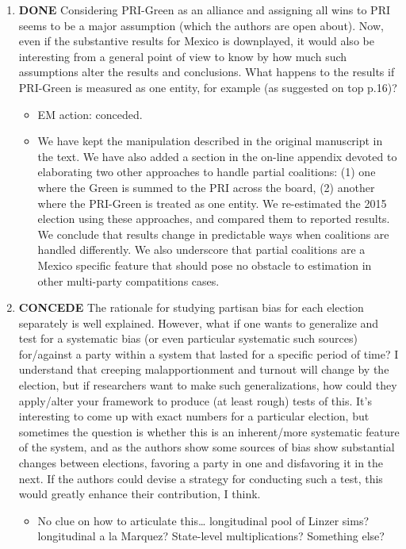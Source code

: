 \documentclass{article}
\begin{document}
\begin{enumerate}
\item {\bfseries\sffamily DONE} Considering PRI-Green as an alliance and assigning all wins to PRI seems to be a major assumption (which the authors are open about). Now, even if the substantive results for Mexico is downplayed, it would also be interesting from a general point of view to know by how much such assumptions alter the results and conclusions. What happens to the results if PRI-Green is measured as one entity, for example (as suggested on top p.16)?
\label{sec:orgheadline12}
\begin{itemize}
\item EM action: conceded.
\item We have kept the manipulation described in the original manuscript in the text. We have also added a section in the on-line appendix devoted to elaborating two other approaches to handle partial coalitions: (1) one where the Green is summed to the PRI across the board, (2) another where the PRI-Green is treated as one entity. We re-estimated the 2015 election using these approaches, and compared them to reported results. We conclude that results change in predictable ways when coalitions are handled differently. We also underscore that partial coalitions are a Mexico specific feature that should pose no obstacle to estimation in other multi-party compatitions cases.
\end{itemize}

\item {\bfseries\sffamily CONCEDE} The rationale for studying partisan bias for each election separately is well explained. However, what if one wants to generalize and test for a systematic bias (or even particular systematic such sources) for/against a party within a system that lasted for a specific period of time? I understand that creeping malapportionment and turnout will change by the election, but if researchers want to make such generalizations, how could they apply/alter your framework to produce (at least rough) tests of this. It's interesting to come up with exact numbers for a particular election, but sometimes the question is whether this is an inherent/more systematic feature of the system, and as the authors show some sources of bias show substantial changes between elections, favoring a party in one and disfavoring it in the next. If the authors could devise a strategy for conducting such a test, this would greatly enhance their contribution, I think.
\label{sec:orgheadline13}
\begin{itemize}
\item No clue on how to articulate this\ldots{} longitudinal pool of Linzer sims? longitudinal a la Marquez? State-level multiplications? Something else?
\end{itemize}


\end{enumerate}
\end{document}
